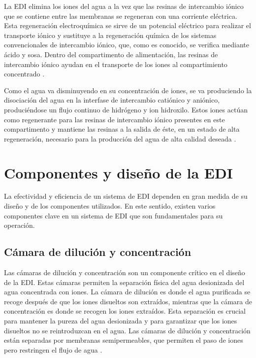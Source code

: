 
La EDI elimina los iones del agua a la vez que las resinas de intercambio iónico que se contiene entre las membranas se
regeneran con una corriente eléctrica. Esta regeneración electroquímica se sirve de un potencial eléctrico para realizar el
transporte iónico y sustituye a la regeneración química de los sistemas convencionales de intercambio iónico, que, como es conocido,
se verifica mediante ácido y sosa. Dentro del compartimento de alimentación, las resinas de intercambio iónico ayudan en el transporte de
los iones al compartimiento concentrado \cite{alvaradoElectrodeionizationPrinciplesStrategies2014}.

Como el agua va disminuyendo en su concentración de iones, se va produciendo la disociación del agua en la interfase de intercambio
catiónico y aniónico, produciéndose un flujo continuo de hidrógeno y ion hidroxilo. Estos iones actúan como regenerante para las resinas
de intercambio iónico presentes en este compartimento y mantiene las resinas a la salida de éste, en un estado de alta regeneración,
necesario para la producción del agua de alta calidad deseada \cite{alvaradoElectrodeionizationPrinciplesStrategies2014}.


\section{Componentes y diseño de la EDI}
La efectividad y eficiencia de un sistema de EDI dependen en gran medida de su diseño y de los componentes utilizados.
En este sentido, existen varios componentes clave en un sistema de EDI que son fundamentales para su operación.

\subsection{Cámara de dilución y concentración}
Las cámaras de dilución y concentración son un componente crítico en el diseño de la EDI. Estas cámaras permiten la separación
física del agua desionizada del agua concentrada con iones. La cámara de dilución es donde el agua purificada se recoge después
de que los iones disueltos son extraídos, mientras que la cámara de concentración es donde se recogen los iones extraídos.
Esta separación es crucial para mantener la pureza del agua desionizada y para garantizar que los iones disueltos no se
reintroduzcan en el agua. Las cámaras de dilución y concentración están separadas por membranas semipermeables, que permiten
el paso de iones pero restringen el flujo de agua \cite{rasSamplingPreconcentrationTechniques2009} \cite{jimenezComparisonMultipleCalibration2020}.

